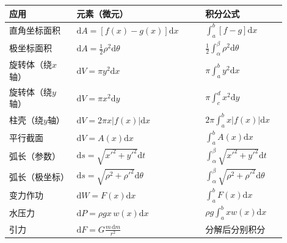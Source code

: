 \begin{center}
\begin{tabular}{@{}p{0.22\linewidth}p{0.42\linewidth}p{0.26\linewidth}@{}}
\toprule
\textbf{应用} & \textbf{元素（微元）} & \textbf{积分公式} \\
\midrule
直角坐标面积 & $\mathrm{d}A=[f(x)-g(x)]\mathrm{d}x$ & $\int_a^b[f-g]\mathrm{d}x$ \\
极坐标面积 & $\mathrm{d}A=\frac12\rho^2\mathrm{d}\theta$ & $\frac12\int_\alpha^\beta\rho^2\mathrm{d}\theta$ \\
旋转体（绕$x$轴） & $\mathrm{d}V=\pi y^2\mathrm{d}x$ & $\pi\int_a^by^2\mathrm{d}x$ \\
旋转体（绕$y$轴） & $\mathrm{d}V=\pi x^2\mathrm{d}y$ & $\pi\int_c^dx^2\mathrm{d}y$ \\
柱壳（绕$y$轴） & $\mathrm{d}V=2\pi x|f(x)|\mathrm{d}x$ & $2\pi\int_a^bx|f(x)|\mathrm{d}x$ \\
平行截面 & $\mathrm{d}V=A(x)\mathrm{d}x$ & $\int_a^bA(x)\mathrm{d}x$ \\
弧长（参数） & $\mathrm{d}s=\sqrt{x'^2+y'^2}\mathrm{d}t$ & $\int_\alpha^\beta\sqrt{x'^2+y'^2}\mathrm{d}t$ \\
弧长（极坐标） & $\mathrm{d}s=\sqrt{\rho^2+\rho'^2}\mathrm{d}\theta$ & $\int_\alpha^\beta\sqrt{\rho^2+\rho'^2}\mathrm{d}\theta$ \\
变力作功 & $\mathrm{d}W=F(x)\mathrm{d}x$ & $\int_a^bF(x)\mathrm{d}x$ \\
水压力 & $\mathrm{d}P=\rho gx\,w(x)\mathrm{d}x$ & $\rho g\int_a^bxw(x)\mathrm{d}x$ \\
引力 & $\mathrm{d}F=G\frac{m\,\mathrm{d}m}{r^2}$ & 分解后分别积分 \\
\bottomrule
\end{tabular}
\end{center}
